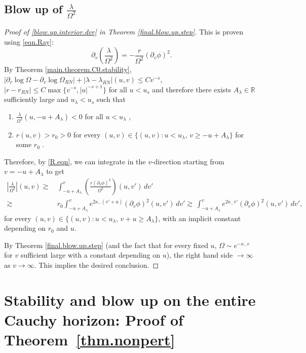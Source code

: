 \documentclass[10pt, reqno]{amsart}
\theoremstyle{definition}
\theoremstyle{remark}
\numberwithin{equation}{section}
\newcommand{\rd}{\partial}
\newcommand{\0}{\emptyset}
\newcommand{\Omg}{\Omega}
\newcommand{\f}{\frac}
\begin{document}
\subsection{Blow up of $\f{\lambda}{\Omg^2}$}\label{sec.blow.up.dvr}


\begin{proof}[Proof of \eqref{blow.up.interior.dvr} in Theorem \ref{final.blow.up.step}]
This is proven using \eqref{eqn.Ray}:
\begin{equation*}
\rd_v(\f{\lambda}{\Omg^2})=-\f{r}{\Omg^2}(\rd_v\phi)^2.
\end{equation*}
By Theorem \ref{main.theorem.C0.stability}, $|\rd_v\log\Omg-\rd_v\log\Omg_{RN}|+|\lambda-\lambda_{RN}|(u,v) \leq C v^{-s}$, $|r-r_{RN}| \leq C \max\{v^{-s}, |u|^{-s+1} \}$ for all $u<u_s$ and therefore there exists $A_\lambda\in\mathbb R$ sufficiently large and $u_\lambda<u_s$ such that 
\begin{enumerate}
\item 
$\f{\lambda}{\Omg^{2}}(u,-u+A_\lambda)<0$ for all $u<u_\lambda$ ,
\item 
$r(u,v)>r_0>0$ for every $(u,v)\in \{(u,v): u<u_\lambda, \, v\geq -u+A_\lambda \}$ for some $r_0$ .
\end{enumerate}
Therefore, by \eqref{R.eqn}, we can integrate in the $v$-direction starting from $v=-u+A_\lambda$ to get
\begin{equation*}
\begin{split}
\left|\f{\lambda}{\Omg^2}\right|(u,v)\gtrsim &\, \int_{-u+A_\lambda}^v (\f{r(\rd_v\phi)^2}{\Omg^2})(u,v')\, dv'\\
\gtrsim &\,r_0\int_{-u+A_\lambda}^v e^{2\kappa_-(v'+u)}(\rd_v\phi)^2(u,v')\, dv'
\gtrsim  \,\int_{-u+A_\lambda}^v e^{2\kappa_- v'}(\rd_v\phi)^2(u,v')\, dv',
\end{split}
\end{equation*}
for every $(u,v)\in \{(u,v): u<u_\lambda, \, v+u\geq A_\lambda\}$, with an implicit constant depending on $r_0$ and $u$. 

By Theorem \ref{final.blow.up.step} (and the fact that for every fixed $u$, $\Omg\sim e^{-\kappa_- v}$ for $v$ sufficient large with a constant depending on $u$), the right hand side $\to \infty$ as $v\to \infty$. This implies the desired conclusion.

\end{proof}

\section{Stability and blow up on the entire Cauchy horizon: Proof of Theorem~\ref{thm.nonpert}} \label{sec.nonpert}
\end{document}
